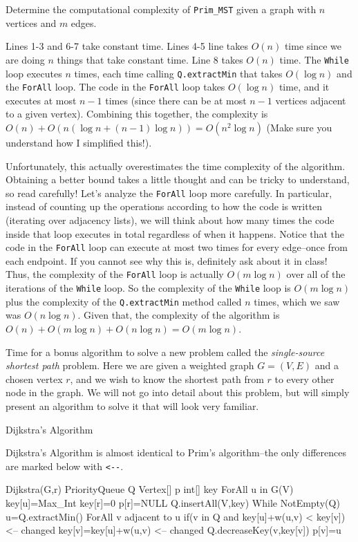 \begin{exer}
Determine the computational complexity of \verb+Prim_MST+
given a graph with $n$ vertices and $m$ edges.
\vspace*{1.6in}
\begin{answer}
Lines 1-3 and  6-7 take constant time.
Lines 4-5 line takes $O(n)$ time since we are doing $n$ things
that take constant time.
Line 8 takes $O(n)$ time.
The \verb+While+ loop executes $n$ times,
each time calling \verb+Q.extractMin+ that takes $O(\log n)$
and the \verb+ForAll+ loop.
The code in the \verb+ForAll+ loop takes $O(\log n)$
time, and it executes at most $n-1$ times (since there can be
at most $n-1$ vertices adjacent to a given vertex).
Combining this together, the complexity is
$O(n)+O(n(\log n + (n-1)\log n))=O(n^2\log n)$ 
(Make sure you understand how I simplified this!).

Unfortunately, this actually overestimates the time complexity
of the algorithm. 
Obtaining a better bound takes a little thought and can be tricky
to understand, so read carefully!
Let's analyze the \verb+ForAll+ loop
more carefully. In particular, instead of counting up the operations
according to how the code is written (iterating over adjacency lists),
we will think about how many times the code inside that 
loop executes in total regardless of when it happens. 
Notice that the code in the \verb+ForAll+ loop
can execute at most two times for every edge--once from each
endpoint. If you cannot see why this is, definitely ask about it in class!
Thus, the complexity of the \verb+ForAll+ loop
is actually $O(m\log n)$ over all of the iterations of the
\verb+While+ loop. So the complexity of the \verb+While+
loop is $O(m\log n)$ plus the complexity of the \verb+Q.extractMin+ method called $n$ times, which we saw was $O(n\log n)$.
Given that, the complexity of the algorithm is 
$O(n)+O(m\log n)+O(n\log n)=O(m\log n)$.
\end{answer}
\end{exer}

Time for a bonus algorithm to solve a new problem called
the {\em single-source shortest path} problem.
Here we are given a weighted graph $G=(V,E)$ and a 
chosen vertex $r$, and we wish to know the shortest path
from $r$ to every other node in the graph. We will not
go into detail about this problem, but will simply present
an algorithm to solve it that will look very familiar.

\begin{proc}
Dijkstra's Algorithm

Dijkstra's Algorithm is almost
identical to Prim's algorithm--the only differences
are marked below with \verb+<--+.
\begin{code}
Dijkstra(G,r)
  PriorityQueue Q
  Vertex[] p 
  int[] key
  ForAll u in G(V)
      key[u]=Max_Int
  key[r]=0
  p[r]=NULL
  Q.insertAll(V,key)
  While NotEmpty(Q)
      u=Q.extractMin()
      ForAll v adjacent to u
        if(v in Q and key[u]+w(u,v) < key[v]) <-- changed
            key[v]=key[u]+w(u,v)              <-- changed
            Q.decreaseKey(v,key[v]) 
            p[v]=u
\end{code}
\end{proc}


